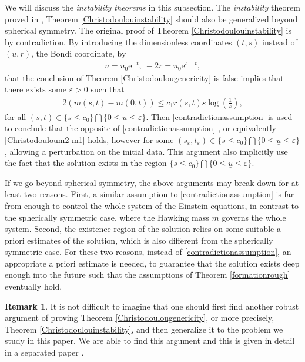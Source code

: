 \documentclass[11pt,reqno]{amsart}
\theoremstyle{definition}
\newtheorem{remark}{Remark}[section]
\numberwithin{equation}{section}
\def\ub{\underline{u}}
\begin{document}
We will discuss the \emph{instability theorems} in this subsection. The \emph{instability} theorem proved in \cite{Chr99}, Theorem \ref{Christodoulouinstability} should also be generalized beyond spherical symmetry. The original proof of Theorem \ref{Christodoulouinstability} is by contradiction. By introducing the dimensionless coordinates $(t,s)$ instead of $(u,r)$, the Bondi coordinate, by
\begin{align*}
u=u_0\mathrm{e}^{-t},\ -2r=u_0\mathrm{e}^{s-t},
\end{align*}
that the conclusion of Theorem \ref{Christodoulougenericity} is false implies that there exists some $\varepsilon>0$ such that 
\begin{align}\label{contradictionassumption}
2(m(s,t)-m(0,t))\le c_1r(s,t)s\log\left(\frac{1}{s}\right),
\end{align}
for all $(s,t)\in\{s\le c_0\}\bigcap\{0\le\ub\le\varepsilon\}$. Then \eqref{contradictionassumption} is used to conclude that the opposite of \eqref{contradictionassumption} , or equivalently \eqref{Christodouloum2-m1} holds, however for some $(s_{\varepsilon},t_{\varepsilon})\in\{s\le c_0\}\bigcap\{0\le\ub\le\varepsilon\}$, allowing a perturbation on the initial data. This argument also implicitly use the fact that the solution exists in the region $\{s\le c_0\}\bigcap\{0\le\ub\le\varepsilon\}$.

If we go beyond spherical symmetry, the above arguments may break down for at least two reasons. First, a similar assumption to \eqref{contradictionassumption} is far from enough to control the whole system of the Einstein equations, in contrast to the spherically symmetric case, where the Hawking mass $m$ governs the whole system. Second, the existence region of the solution relies on some suitable a priori estimates of the solution, which is also different from the spherically symmetric case. For these two reasons, instead of \eqref{contradictionassumption}, an appropriate a priori estimate is needed, to guarantee that the solution exists deep enough into the future such that the assumptions of Theorem \ref{formationrough} eventually hold. 
\begin{remark}
It is not difficult to imagine that one should first find another robust argument of proving Theorem \ref{Christodoulougenericity}, or more precisely, Theorem \ref{Christodoulouinstability}, and then generalize it to the problem we study in this paper. We are able to find this argument and this is given in detail in a separated paper \cite{Li-Liu}. 
\end{remark}
\end{document}
